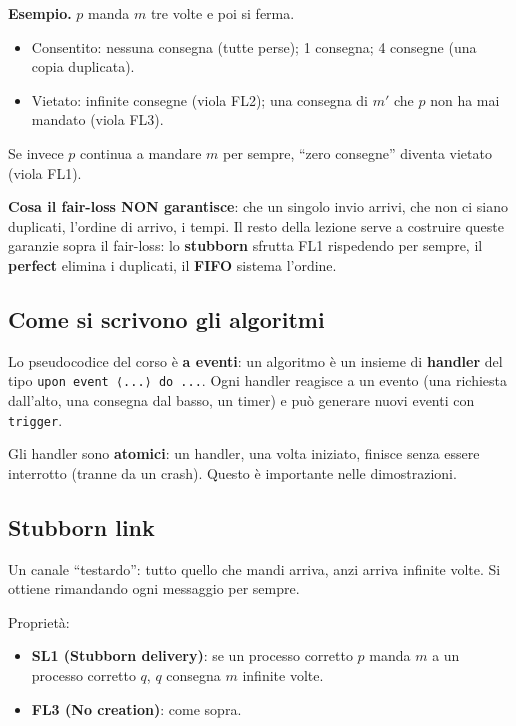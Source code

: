 \textbf{Esempio.} \(p\) manda \(m\) tre volte e poi si ferma.

\begin{itemize}
\tightlist
\item
  Consentito: nessuna consegna (tutte perse); 1 consegna; 4 consegne (una copia duplicata).
\item
  Vietato: infinite consegne (viola FL2); una consegna di \(m'\) che \(p\) non ha mai mandato (viola FL3).
\end{itemize}

Se invece \(p\) continua a mandare \(m\) per sempre, ``zero consegne'' diventa vietato (viola FL1).

\textbf{Cosa il fair-loss NON garantisce}: che un singolo invio arrivi, che non ci siano duplicati, l'ordine di arrivo, i tempi. Il resto della lezione serve a costruire queste garanzie sopra il fair-loss: lo \textbf{stubborn} sfrutta FL1 rispedendo per sempre, il \textbf{perfect} elimina i duplicati, il \textbf{FIFO} sistema l'ordine.

\subsection{Come si scrivono gli algoritmi}

Lo pseudocodice del corso è \textbf{a eventi}: un algoritmo è un insieme di \textbf{handler} del tipo \texttt{upon\ event\ ⟨...⟩\ do\ ...}. Ogni handler reagisce a un evento (una richiesta dall'alto, una consegna dal basso, un timer) e può generare nuovi eventi con \texttt{trigger}.

Gli handler sono \textbf{atomici}: un handler, una volta iniziato, finisce senza essere interrotto (tranne da un crash). Questo è importante nelle dimostrazioni.

\subsection{Stubborn link}

\begin{inbreve}

Un canale ``testardo'': tutto quello che mandi arriva, anzi arriva infinite volte. Si ottiene rimandando ogni messaggio per sempre.

\end{inbreve}

Proprietà:

\begin{itemize}
\tightlist
\item
  \textbf{SL1 (Stubborn delivery)}: se un processo corretto \(p\) manda \(m\) a un processo corretto \(q\), \(q\) consegna \(m\) infinite volte.
\item
  \textbf{FL3 (No creation)}: come sopra.
\end{itemize}

